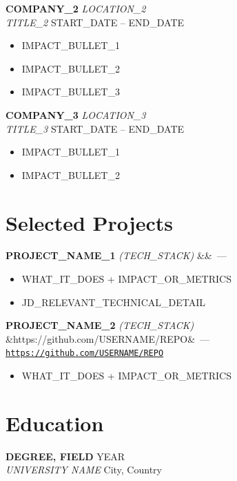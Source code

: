 \documentclass[10pt, letterpaper]{article}
\newcommand{\roleentry}[4]{%
  \textbf{#1} \hfill \textit{#3}\\
  \textit{#2} \hfill #4
  \vspace{2pt}
}
\newcommand{\projectentry}[3]{%
  \textbf{#1} \textit{(#2)}%
  \ifx&#3&\else\ — \href{#3}{\texttt{#3}}\fi
}
\begin{document}
\vspace{6pt}

\roleentry{COMPANY\_2}{TITLE\_2}{LOCATION\_2}{START\_DATE -- END\_DATE}
\begin{itemize}
  \item IMPACT\_BULLET\_1
  \item IMPACT\_BULLET\_2
  \item IMPACT\_BULLET\_3
\end{itemize}

\vspace{6pt}

\roleentry{COMPANY\_3}{TITLE\_3}{LOCATION\_3}{START\_DATE -- END\_DATE}
\begin{itemize}
  \item IMPACT\_BULLET\_1
  \item IMPACT\_BULLET\_2
\end{itemize}

\section{Selected Projects}  %

\projectentry{PROJECT\_NAME\_1}{TECH\_STACK}{}
\begin{itemize}
  \item WHAT\_IT\_DOES + IMPACT\_OR\_METRICS
  \item JD\_RELEVANT\_TECHNICAL\_DETAIL
\end{itemize}

\vspace{4pt}

\projectentry{PROJECT\_NAME\_2}{TECH\_STACK}{https://github.com/USERNAME/REPO}
\begin{itemize}
  \item WHAT\_IT\_DOES + IMPACT\_OR\_METRICS
\end{itemize}

\section{Education}

\textbf{DEGREE, FIELD} \hfill YEAR\\
\textit{UNIVERSITY NAME} \hfill City, Country

\end{document}
